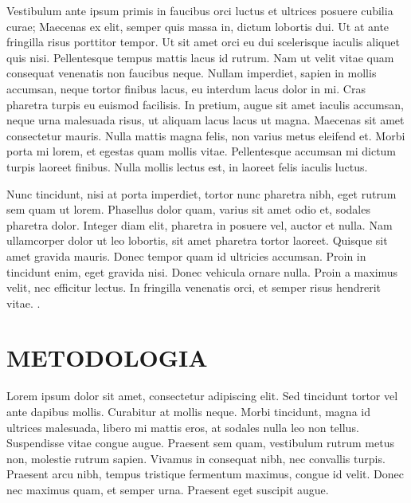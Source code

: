 \documentclass[12pt,a4paper]{article}
\begin{document}
Vestibulum ante ipsum primis in faucibus orci luctus et ultrices posuere cubilia curae; Maecenas ex elit, semper quis massa in, dictum lobortis dui. Ut at ante fringilla risus porttitor tempor. Ut sit amet orci eu dui scelerisque iaculis aliquet quis nisi. Pellentesque tempus mattis lacus id rutrum. Nam ut velit vitae quam consequat venenatis non faucibus neque. Nullam imperdiet, sapien in mollis accumsan, neque tortor finibus lacus, eu interdum lacus dolor in mi. Cras pharetra turpis eu euismod facilisis. In pretium, augue sit amet iaculis accumsan, neque urna malesuada risus, ut aliquam lacus lacus ut magna. Maecenas sit amet consectetur mauris. Nulla mattis magna felis, non varius metus eleifend et. Morbi porta mi lorem, et egestas quam mollis vitae. Pellentesque accumsan mi dictum turpis laoreet finibus. Nulla mollis lectus est, in laoreet felis iaculis luctus.


Nunc tincidunt, nisi at porta imperdiet, tortor nunc pharetra nibh, eget rutrum sem quam ut lorem. Phasellus dolor quam, varius sit amet odio et, sodales pharetra dolor. Integer diam elit, pharetra in posuere vel, auctor et nulla. Nam ullamcorper dolor ut leo lobortis, sit amet pharetra tortor laoreet. Quisque sit amet gravida mauris. Donec tempor quam id ultricies accumsan. Proin in tincidunt enim, eget gravida nisi. Donec vehicula ornare nulla. Proin a maximus velit, nec efficitur lectus. In fringilla venenatis orci, et semper risus hendrerit vitae. \cite{lamport1994}.



\clearpage %
\section{METODOLOGIA}
\label{metodologia}
Lorem ipsum dolor sit amet, consectetur adipiscing elit. Sed tincidunt tortor vel ante dapibus mollis. Curabitur at mollis neque. Morbi tincidunt, magna id ultrices malesuada, libero mi mattis eros, at sodales nulla leo non tellus. Suspendisse vitae congue augue. Praesent sem quam, vestibulum rutrum metus non, molestie rutrum sapien. Vivamus in consequat nibh, nec convallis turpis. Praesent arcu nibh, tempus tristique fermentum maximus, congue id velit. Donec nec maximus quam, et semper urna. Praesent eget suscipit augue.
\end{document}
